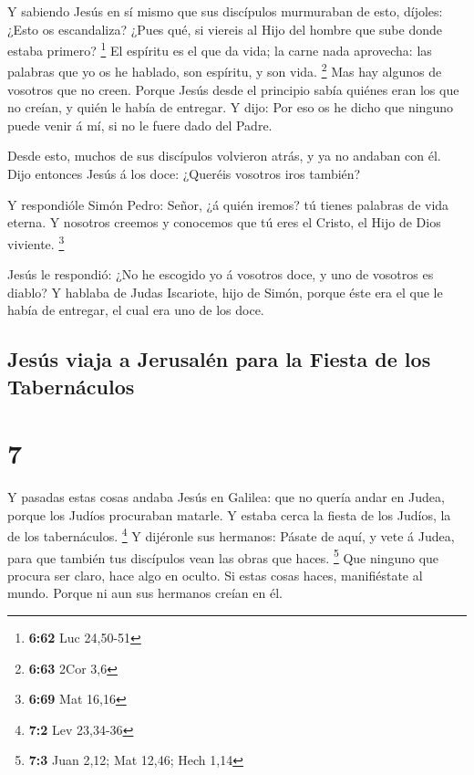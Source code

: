  Y sabiendo Jesús en sí mismo que sus discípulos murmuraban
de esto, díjoles: ¿Esto os escandaliza?  ¿Pues qué, si
viereis al Hijo del hombre que sube donde estaba primero? \footnote{\textbf{6:62}
  Luc 24,50-51}  El espíritu es el que da vida; la carne
nada aprovecha: las palabras que yo os he hablado, son espíritu, y son
vida. \footnote{\textbf{6:63} 2Cor 3,6}  Mas hay algunos de
vosotros que no creen. Porque Jesús desde el principio sabía quiénes
eran los que no creían, y quién le había de entregar.  Y
dijo: Por eso os he dicho que ninguno puede venir á mí, si no le fuere
dado del Padre.

 Desde esto, muchos de sus discípulos volvieron atrás, y ya
no andaban con él.  Dijo entonces Jesús á los doce:
¿Queréis vosotros iros también?

 Y respondióle Simón Pedro: Señor, ¿á quién iremos? tú
tienes palabras de vida eterna.  Y nosotros creemos y
conocemos que tú eres el Cristo, el Hijo de Dios viviente. \footnote{\textbf{6:69}
  Mat 16,16}

 Jesús le respondió: ¿No he escogido yo á vosotros doce, y
uno de vosotros es diablo?  Y hablaba de Judas Iscariote,
hijo de Simón, porque éste era el que le había de entregar, el cual era
uno de los doce.

\hypertarget{jesuxfas-viaja-a-jerusaluxe9n-para-la-fiesta-de-los-tabernuxe1culos}{%
\subsection{Jesús viaja a Jerusalén para la Fiesta de los
Tabernáculos}\label{jesuxfas-viaja-a-jerusaluxe9n-para-la-fiesta-de-los-tabernuxe1culos}}

\hypertarget{section-6}{%
\section{7}\label{section-6}}

 Y pasadas estas cosas andaba Jesús en Galilea: que no
quería andar en Judea, porque los Judíos procuraban matarle.
 Y estaba cerca la fiesta de los Judíos, la de los
tabernáculos. \footnote{\textbf{7:2} Lev 23,34-36}  Y
dijéronle sus hermanos: Pásate de aquí, y vete á Judea, para que también
tus discípulos vean las obras que haces. \footnote{\textbf{7:3} Juan
  2,12; Mat 12,46; Hech 1,14}  Que ninguno que procura ser
claro, hace algo en oculto. Si estas cosas haces, manifiéstate al mundo.
 Porque ni aun sus hermanos creían en él.

